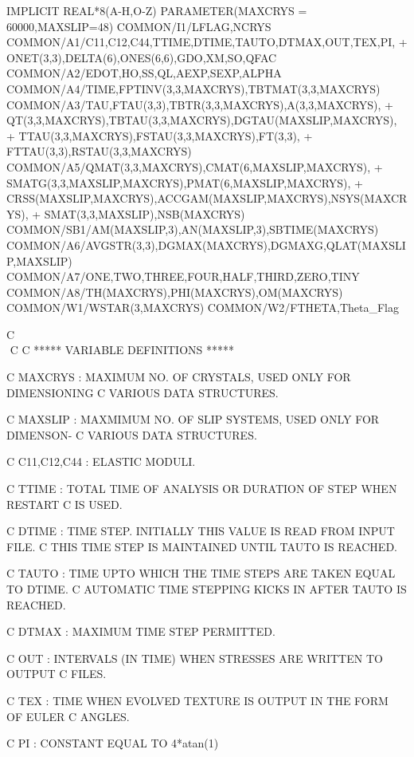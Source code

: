 	IMPLICIT REAL*8(A-H,O-Z)
	PARAMETER(MAXCRYS = 60000,MAXSLIP=48)
	COMMON/I1/LFLAG,NCRYS
        COMMON/A1/C11,C12,C44,TTIME,DTIME,TAUTO,DTMAX,OUT,TEX,PI,
     +     ONET(3,3),DELTA(6),ONES(6,6),GDO,XM,SO,QFAC
	COMMON/A2/EDOT,HO,SS,QL,AEXP,SEXP,ALPHA
	COMMON/A4/TIME,FPTINV(3,3,MAXCRYS),TBTMAT(3,3,MAXCRYS)
	COMMON/A3/TAU,FTAU(3,3),TBTR(3,3,MAXCRYS),A(3,3,MAXCRYS),
     +     QT(3,3,MAXCRYS),TBTAU(3,3,MAXCRYS),DGTAU(MAXSLIP,MAXCRYS),
     +     TTAU(3,3,MAXCRYS),FSTAU(3,3,MAXCRYS),FT(3,3),
     +     FTTAU(3,3),RSTAU(3,3,MAXCRYS)
	COMMON/A5/QMAT(3,3,MAXCRYS),CMAT(6,MAXSLIP,MAXCRYS),
     +     SMATG(3,3,MAXSLIP,MAXCRYS),PMAT(6,MAXSLIP,MAXCRYS),
     +     CRSS(MAXSLIP,MAXCRYS),ACCGAM(MAXSLIP,MAXCRYS),NSYS(MAXCRYS),
     +     SMAT(3,3,MAXSLIP),NSB(MAXCRYS)
        COMMON/SB1/AM(MAXSLIP,3),AN(MAXSLIP,3),SBTIME(MAXCRYS)
	COMMON/A6/AVGSTR(3,3),DGMAX(MAXCRYS),DGMAXG,QLAT(MAXSLIP,MAXSLIP)
        COMMON/A7/ONE,TWO,THREE,FOUR,HALF,THIRD,ZERO,TINY
        COMMON/A8/TH(MAXCRYS),PHI(MAXCRYS),OM(MAXCRYS)
        COMMON/W1/WSTAR(3,MAXCRYS)
        COMMON/W2/FTHETA,Theta_Flag

C $$$$$$$$$$$$$$$$$$$$$$$$$$$$$$$$$$$$$$$$$$$$$$$$$$$$$$$$$$$$$$$$$$$$$$
C
C               ***** VARIABLE DEFINITIONS *****

C   MAXCRYS     : MAXIMUM NO. OF CRYSTALS, USED ONLY FOR DIMENSIONING
C                 VARIOUS DATA STRUCTURES.

C   MAXSLIP     : MAXMIMUM NO. OF SLIP SYSTEMS, USED ONLY FOR DIMENSON-
C                 VARIOUS DATA STRUCTURES.

C   C11,C12,C44 : ELASTIC MODULI.

C   TTIME       : TOTAL TIME OF ANALYSIS OR DURATION OF STEP WHEN RESTART
C                 IS USED.

C   DTIME       : TIME STEP. INITIALLY THIS VALUE IS READ FROM INPUT FILE.
C                 THIS TIME STEP IS MAINTAINED UNTIL TAUTO IS REACHED.

C   TAUTO       : TIME UPTO WHICH THE TIME STEPS ARE TAKEN EQUAL TO DTIME.
C                 AUTOMATIC TIME STEPPING KICKS IN AFTER TAUTO IS REACHED.

C   DTMAX       : MAXIMUM TIME STEP PERMITTED.

C   OUT         : INTERVALS (IN TIME) WHEN STRESSES ARE WRITTEN TO OUTPUT
C                 FILES.
 
C   TEX         : TIME WHEN EVOLVED TEXTURE IS OUTPUT IN THE FORM OF EULER
C                 ANGLES.

C   PI          : CONSTANT EQUAL TO 4*atan(1)

